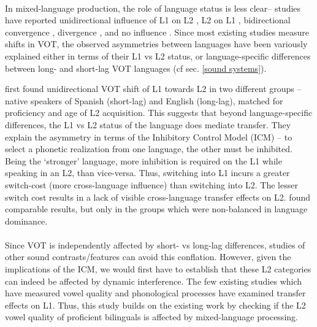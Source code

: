 \documentclass[11pt]{article}
\begin{document}
\paragraph{}In mixed-language production, the role of language status is less clear-- studies have reported unidirectional influence of L1 on L2 \cite{balukas2015spanish,antoniou2011inter,vsimavckova2015immediate,goldrick2014language}, L2 on L1 \cite{tsui2019impact,elias2017effects, olson2013bilingual}, bidirectional convergence \cite{bullock2009trying, olson2016role}, divergence \cite{bullock2009trying,vsimavckova2018patterns}, and no influence \cite{muldner2019phonetics,schwartz2015language}. Since most existing studies measure shifts in VOT, the observed asymmetries between languages have been variously explained either in terms of their L1 vs L2 status, or language-specific differences between long- and short-lag VOT languages (cf sec. \ref{sound systems}).

 first found unidirectional VOT shift of L1 towards L2 in two different groups -- native speakers of Spanish (short-lag) and English (long-lag), matched for proficiency and age of L2 acquisition. This suggests that beyond language-specific differences, the L1 vs L2 status of the language does mediate transfer. They explain the asymmetry in terms of the Inhibitory Control Model (ICM) \cite{green1998mental} -- to select a phonetic realization from one language, the other must be inhibited. Being the `stronger' language, more inhibition is required on the L1 while speaking in an L2, than vice-versa. Thus, switching into L1 incurs a greater switch-cost (more cross-language influence) than switching into L2. The lesser switch cost results in a lack of visible cross-language transfer effects on L2.  found comparable results, but only in the groups which were non-balanced in language dominance.

\paragraph{}Since VOT is independently affected by short- vs long-lag differences, studies of other sound contrasts/features can avoid this conflation. However, given the implications of the ICM, we would first have to establish that these L2 categories can indeed be affected by dynamic interference. The few existing studies which have measured vowel quality \cite{simonet2014phonetic,muldner2019phonetics,elias2017effects} and phonological processes \cite{simonet2020increased,schwartz2015language} have examined transfer effects on L1. Thus, this study builds on the existing work by checking if the L2 vowel quality of proficient bilinguals is affected by mixed-language processing.
\end{document}
